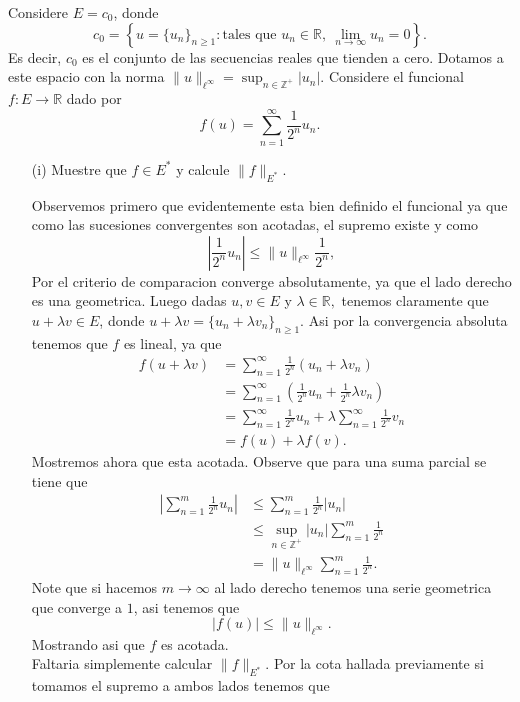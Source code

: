 
Considere $E = c_0$, donde
\[
c_0 = \left\{ u = \{u_n\}_{n \geq 1} :\text{tales que } u_n \in \mathbb{R}, \ \lim_{n \to \infty} u_n = 0 \right\}.
\]
Es decir, $c_0$ es el conjunto de las secuencias reales que tienden a cero. Dotamos a este espacio con la norma
$
\|u\|_{\ell^\infty} = \sup_{n \in \mathbb{Z}^+} |u_n|.
$
Considere el funcional $f : E \to \mathbb{R}$ dado por
\[
f(u) = \sum_{n=1}^{\infty} \frac{1}{2^n} u_n.
\]

\begin{enumerate}
    \item[(i)] Muestre que $f \in E^*$ y calcule $\|f\|_{E^*}$.
    \begin{sols}
    Observemos primero que evidentemente esta bien definido el funcional ya que como las sucesiones convergentes son acotadas, el supremo existe y como
    $$\left|\frac{1}{2^n}u_n\right|\leq\|u\|_{\ell^\infty}\frac{1}{2^n},$$ 
    Por el criterio de comparacion converge absolutamente, ya que el lado derecho es una geometrica. Luego dadas $u,v\in E$ y $\lambda\in\mathbb{R},$ tenemos claramente que $u+\lambda v\in E$, donde $u+\lambda v=\{u_n+\lambda v_n\}_{n\geq 1}.$ Asi por la convergencia absoluta tenemos que $f$ es lineal, ya que
    \begin{align*}
       f(u+\lambda v)&=\sum_{n=1}^\infty\frac{1}{2^n}(u_n+\lambda v_n)\\
       &=\sum_{n=1}^\infty\left(\frac{1}{2^n}u_n+\frac{1}{2^n}\lambda v_n\right)\\
       &=\sum_{n=1}^\infty\frac{1}{2^n}u_n+\lambda\sum_{n=1}^\infty\frac{1}{2^n} v_n\\
       &=f(u)+\lambda f(v)
    .\end{align*}
        Mostremos ahora que esta acotada. Observe que para una suma parcial se tiene que
        \begin{align*}
            \left|\sum_{n=1}^m\frac{1}{2^n}u_n\right|&\leq\sum_{n=1}^m\frac{1}{2^n}|u_n|\\
            &\leq \sup_{n\in\mathbb{Z}^+}|u_n|\sum_{n=1}^m\frac{1}{2^n}\\
            &=\|u\|_{\ell^\infty}\sum_{n=1}^m\frac{1}{2^n}
        .\end{align*}
    Note que si hacemos $m\to\infty$ al lado derecho tenemos una serie geometrica que converge a $1$, asi tenemos que
    $$|f(u)|\leq \|u\|_{\ell^\infty}.$$
    Mostrando asi que $f$ es acotada.\\
    Faltaria simplemente calcular $\|f\|_{E^*}.$ Por la cota hallada previamente si tomamos el supremo a ambos lados tenemos que

\end{sols}
\end{enumerate}
